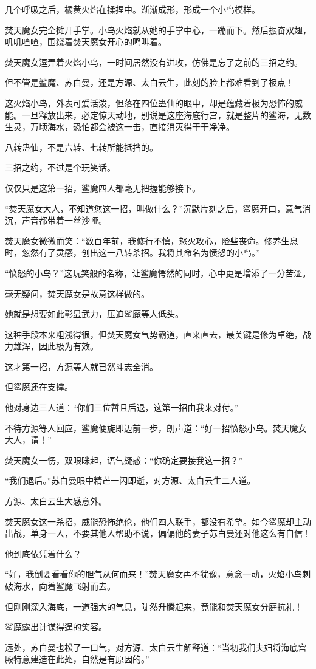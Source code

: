 \begin{this_body}
几个呼吸之后，橘黄火焰在揉捏中。渐渐成形，形成一个小鸟模样。

焚天魔女完全摊开手掌。小鸟火焰就从她的手掌中心，一蹦而下。然后振奋双翅，叽叽喳喳，围绕着焚天魔女开心的鸣叫着。

焚天魔女逗弄着火焰小鸟，一时间居然没有进攻，仿佛是忘了之前的三招之约。

但不管是鲨魔、苏白曼，还是方源、太白云生，此刻的脸上都难看到了极点！

这火焰小鸟，外表可爱活泼，但落在四位蛊仙的眼中，却是蕴藏着极为恐怖的威能。一旦释放出来，必定惊天动地，别说是这座海底行宫，就是整片的鲨海，无数生灵，万顷海水，恐怕都会被这一击，直接消灭得干干净净。

八转蛊仙，不是六转、七转所能抵挡的。

三招之约，不过是个玩笑话。

仅仅只是这第一招，鲨魔四人都毫无把握能够接下。

“焚天魔女大人，不知道您这一招，叫做什么？”沉默片刻之后，鲨魔开口，意气消沉，声音都带着一丝沙哑。

焚天魔女微微而笑：“数百年前，我修行不慎，怒火攻心，险些丧命。修养生息时，忽然有了灵感，创出这一八转杀招。我将其命名为愤怒的小鸟。”

“愤怒的小鸟？”这玩笑般的名称，让鲨魔愕然的同时，心中更是增添了一分苦涩。

毫无疑问，焚天魔女是故意这样做的。

她就是想要如此彰显武力，压迫鲨魔等人低头。

这种手段本来粗浅得很，但焚天魔女气势霸道，直来直去，最关键是修为卓绝，战力雄浑，因此极为有效。

这才第一招，方源等人就已然斗志全消。

但鲨魔还在支撑。

他对身边三人道：“你们三位暂且后退，这第一招由我来对付。”

不待方源等人回应，鲨魔便旋即迈前一步，朗声道：“好一招愤怒小鸟。焚天魔女大人，请！”

焚天魔女一愣，双眼眯起，语气疑惑：“你确定要接我这一招？”

“我们退后。”苏白曼眼中精芒一闪即逝，对方源、太白云生二人道。

方源、太白云生大感意外。

焚天魔女这一杀招，威能恐怖绝伦，他们四人联手，都没有希望。如今鲨魔却主动出战，单身一人，不要其他人帮助不说，偏偏他的妻子苏白曼还对他这么有自信！

他到底依凭着什么？

“好，我倒要看看你的胆气从何而来！”焚天魔女再不犹豫，意念一动，火焰小鸟刺破海水，向着鲨魔飞射而去。

但刚刚深入海底，一道强大的气息，陡然升腾起来，竟能和焚天魔女分庭抗礼！

鲨魔露出计谋得逞的笑容。

远处，苏白曼也松了一口气，对方源、太白云生解释道：“当初我们夫妇将海底宫殿特意建造在此处，自然是有原因的。”

\end{this_body}

